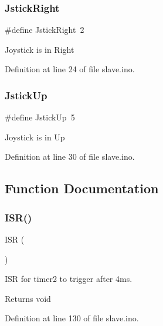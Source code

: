 \subsubsection{\texorpdfstring{JstickRight}{JstickRight}}
{\footnotesize\ttfamily \#define Jstick\+Right~2}

Joystick is in Right 

Definition at line 24 of file slave.\+ino.

\mbox{\label{slave_8ino_a74824f5ea0f46df119320d99c9c287f3}} 
\subsubsection{\texorpdfstring{JstickUp}{JstickUp}}
{\footnotesize\ttfamily \#define Jstick\+Up~5}

Joystick is in Up 

Definition at line 30 of file slave.\+ino.



\subsection{Function Documentation}
\mbox{\label{slave_8ino_a5686c229bdef50123688ab6cb1404230}} 
\subsubsection{\texorpdfstring{ISR()}{ISR()}\hspace{0.1cm}{\footnotesize\ttfamily [1/2]}}
{\footnotesize\ttfamily I\+SR (\begin{DoxyParamCaption}\item[{T\+I\+M\+E\+R2\+\_\+\+C\+O\+M\+P\+A\+\_\+vect}]{ }\end{DoxyParamCaption})}



I\+SR for timer2 to trigger after 4ms. 

\begin{DoxyReturn}{Returns}
void 
\end{DoxyReturn}


Definition at line 130 of file slave.\+ino.

\mbox{\label{slave_8ino_aa282d056dc0e67857fc700fdce321f30}} 
